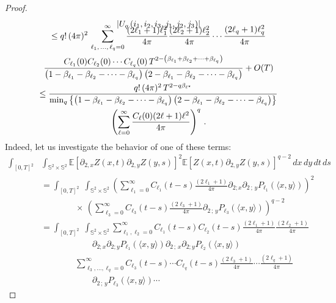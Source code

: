 \documentclass[AHL,Unicode,longabstracts,published]{cedram}
\newcommand{\bbS}{\mathbb{S}}
\newcommand{\bbE}{\mathbb{E}}
\begin{document}
\begin{proof}
\begin{multline*}
\vspace*{-10pt}
\left|U_{q}\left(i_{1},i_{2},i_{3},j_{1},j_{2},j_{3}\right)\right|\\
\leq q!\,(4\pi)^{2}\,\sum_{\ell _{1},\,\dots,\,\ell _{q}=0}^{\infty }\frac{(2\ell _{1}+1)\ell _{1}^{2}}{4\pi}\frac{(2\ell _{2}+1)\ell _{2}^{2}}{4\pi}\cdots \frac{(2\ell _{q}+1)\ell _{q}^{2}}{4\pi} \\
\frac{C_{\ell_1}(0)C_{\ell_2}(0)\cdots C_{\ell_q}(0)\,T^{2-\left(\beta_{\ell_1}+\beta_{\ell_2}+\cdots+\beta_{
\ell_q}\right)}}{\left(1-\beta_{\ell_1}-\beta_{\ell_2}-\cdots-\beta_{\ell_q}\right)\left(2-\beta_{\ell_1}-\beta_{\ell_2}-\cdots-\beta_{\ell_q}\right)}+O(T)\\
\leq \frac{q!\,(4\pi)^{2}\,T^{2-q\beta_{\ell ^{\star }}}}
{\min_{q}\left\{\left(1-\beta_{\ell_{1}}-\beta_{\ell _{2}}-\cdots -\beta_{\ell_{q}}\right)\left(2-\beta_{\ell _{1}}-\beta_{\ell_{2}}-\cdots -\beta_{\ell_{q}}\right)\right\}}
\\
\left(\sum_{\ell =0}^{\infty }\frac{C_\ell(0)(2\ell +1)\ell^{2}}{4\pi}\right)^{q}\,.
\end{multline*}
Indeed, let us investigate the behavior of one of these terms:
\begingroup
\allowdisplaybreaks
\begin{align*}
\int_{[0,T]^2}&\int_{\bbS^2 \times \bbS^2}
\bbE\left[\partial_{2,x} Z(x,t)\partial_{2,y} Z(y,s) \right]^2 \bbE\left[Z(x,t)\partial_{2,y} Z(y,s)
\right]^{q-2}\,dx\,dy\,dt\,ds\\
& =\int_{[0,T]^2}\;\int_{\bbS^2 \times \bbS ^2} \left(\sum_{\ell_1=0}^\infty C_{\ell_1}(t-s)\frac{(2\ell_1+1)}{4\pi}
\partial_{2;x}\partial_{2\,;\,y}P_{\ell_1}(\langle x,y \rangle) \right)^2
\,\\
&\qquad\qquad \times\, \left(\sum_{\ell_3=0}^\infty C_{\ell_3}(t-s)\frac{ (2\ell_3+1)}{4\pi}\partial_{2\,;\,y}P_{\ell_3}(\langle x,y \rangle) \right)^{q-2}\\ 
& = \int_{[0,T]^2}\;\int_{\bbS^2 \times \bbS ^2} \sum_{\ell_1,\ell_2=0}^\infty C_{\ell_1}(t-s)C_{\ell_2}(t-s)\frac{(2\ell_1+1)}{4\pi}\frac{(2\ell_2+1)}{4\pi}\\
&\qquad\qquad\qquad \partial_{2;x}\partial_{2;y}P_{\ell_1}(\langle x,y \rangle)\partial_{2\,;\,x}\partial_{2;y}P_{\ell_2}(\langle x,y \rangle) \\
&\qquad\qquad \sum_{\ell_3,\dots,\ell_q=0}^\infty C_{\ell_3}(t-s)\cdots C_{\ell_q}(t-s)\frac{(2\ell_3+1)}{4\pi}\cdots\frac{(2\ell_q+1)}{4\pi}\\
&\qquad\qquad\qquad
\partial_{2\,;\,y}P_{\ell_3}(\langle x,y \rangle) \cdots

\end{align*}
\end{proof}
\end{document}
